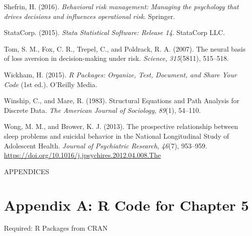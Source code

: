 \documentclass[]{DissertateUSU}
\begin{document}
\hypertarget{ref-shefrin2016behavioral}{}
Shefrin, H. (2016). \emph{Behavioral risk management: Managing the
psychology that drives decisions and influences operational risk}.
Springer.

\hypertarget{ref-Stata14}{}
StataCorp. (2015). \emph{Stata Statistical Software: Release 14}.
StataCorp LLC.

\hypertarget{ref-tom2007neural}{}
Tom, S. M., Fox, C. R., Trepel, C., and Poldrack, R. A. (2007). The
neural basis of loss aversion in decision-making under risk.
\emph{Science}, \emph{315}(5811), 515--518.

\hypertarget{ref-Wickham2015}{}
Wickham, H. (2015). \emph{R Packages: Organize, Test, Document, and
Share Your Code} (1st ed.). O'Reilly Media.

\hypertarget{ref-Winship1983}{}
Winship, C., and Mare, R. (1983). Structural Equations and Path Analysis
for Discrete Data. \emph{The American Journal of Sociology},
\emph{89}(1), 54--110.

\hypertarget{ref-Wong2013}{}
Wong, M. M., and Brower, K. J. (2013). The prospective relationship
between sleep problems and suicidal behavior in the National
Longitudinal Study of Adolescent Health. \emph{Journal of Psychiatric
Research}, \emph{46}(7), 953--959.
\url{https://doi.org/10.1016/j.jpsychires.2012.04.008.The}

\clearpage
{} 
\fancyhead[R]{\thepage} \fancyfoot[C]{}

\vspace*{\fill}

\begin{center}
    APPENDICES 
  \end{center}

\vspace*{\fill}

\clearpage

\doublespacing

\section*{Appendix A: R Code for Chapter
5}\label{appendix-a-r-code-for-chapter-5}

\singlespace

Required: R Packages from CRAN

\small
\end{document}
